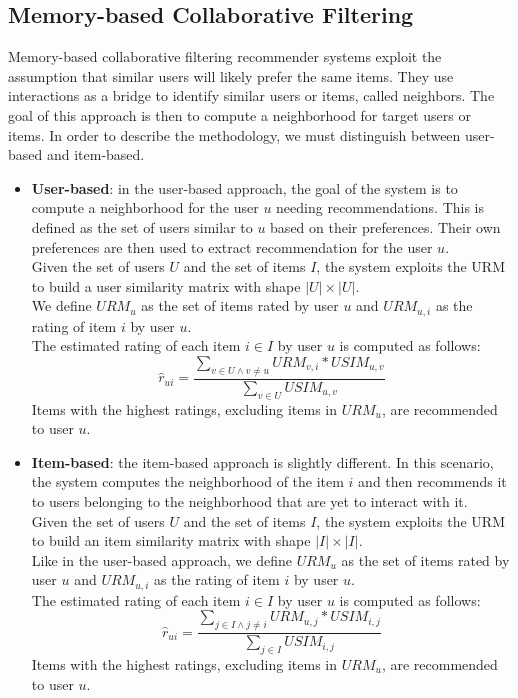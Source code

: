 \subsection{Memory-based Collaborative Filtering}

Memory-based collaborative filtering recommender systems \cite{10.1007/978-0-387-85820-3_1} exploit the assumption that similar users will likely prefer the same items. They use interactions as a bridge to identify similar users or items, called neighbors. The goal of this approach is then to compute a neighborhood for target users or items. In order to describe the methodology, we must distinguish between user-based and item-based.
\begin{itemize}
\item \textbf{User-based}: in the user-based approach, the goal of the system is to compute a neighborhood for the user $u$ needing recommendations. This is defined as the set of users similar to $u$ based on their preferences. Their own preferences are then used to extract recommendation for the user $u$.\\
Given the set of users $U$ and the set of items $I$, the system exploits the URM to build a user similarity matrix with shape $|U| \times |U|$.\\
We define $URM_u$ as the set of items rated by user $u$ and $URM_{u,i}$ as the rating of item $i$ by user $u$.\\
The estimated rating of each item $i \in I$ by user $u$ is computed as follows:
\begin{equation*}
\hat{r}_{ui} = \frac{\sum_{v \in U \wedge v \neq u} URM_{v,i} * USIM_{u,v}}{\sum_{v \in U} USIM_{u,v}}
\end{equation*}
Items with the highest ratings, excluding items in $URM_u$, are recommended to user $u$.
\item \textbf{Item-based}: the item-based approach is slightly different. In this scenario, the system computes the neighborhood of the item $i$ and then recommends it to users belonging to the neighborhood that are yet to interact with it.\\
Given the set of users $U$ and the set of items $I$, the system exploits the URM to build an item similarity matrix with shape $|I| \times |I|$.\\
Like in the user-based approach, we define $URM_u$ as the set of items rated by user $u$ and $URM_{u,i}$ as the rating of item $i$ by user $u$.\\
The estimated rating of each item $i \in I$ by user $u$ is computed as follows:
\begin{equation*}
\hat{r}_{ui} = \frac{\sum_{j \in I \wedge j \neq i} URM_{u,j} * USIM_{i,j}}{\sum_{j \in I} USIM_{i,j}}
\end{equation*}
Items with the highest ratings, excluding items in $URM_u$, are recommended to user $u$.
\end{itemize}


